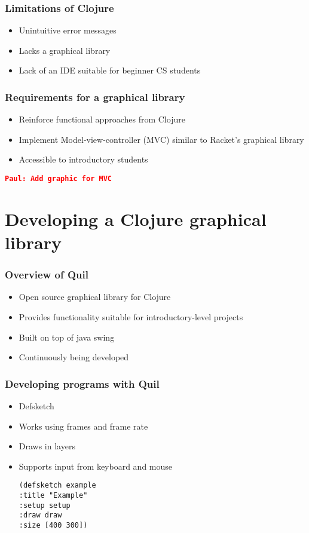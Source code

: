 \documentclass{beamer}
\newcommand{\comment}[1]{{\bf \tt  {#1}}}
\newcommand{\pscomment}[1]{\textcolor{red}{\comment{Paul: {#1}}}}
\begin{document}
\begin{frame}
\frametitle{Limitations of Clojure}
\begin{itemize}
\item Unintuitive error messages
\item Lacks a graphical library
\item Lack of an IDE suitable for beginner CS students
\end{itemize}
\end{frame}

\begin{frame}
\frametitle{Requirements for a graphical library}
\begin{itemize}
\item Reinforce functional approaches from Clojure
\item Implement Model-view-controller (MVC) similar to Racket's graphical library
\item Accessible to introductory students
\end{itemize}
\pscomment{Add graphic for MVC}
\end{frame}

\section{Developing a Clojure graphical library}

\begin{frame}
\frametitle{Overview of Quil}
\begin{itemize}
\item Open source graphical library for Clojure
\item Provides functionality suitable for introductory-level projects
\item Built on top of java swing
\item Continuously being developed
\end{itemize}
\end{frame}

\begin{frame}[fragile]
\frametitle{Developing programs with Quil}
\begin{itemize}
\item Defsketch
\item Works using frames and frame rate
\item Draws in layers
\item Supports input from keyboard and mouse
\begin{verbatim}
(defsketch example 
:title "Example"
:setup setup
:draw draw
:size [400 300])
\end{verbatim}
\end{itemize}
\end{frame}
\end{document}
